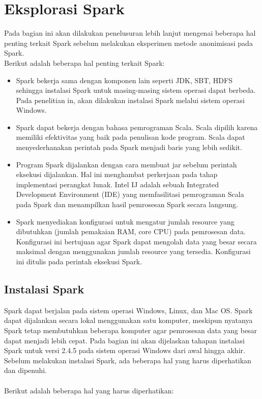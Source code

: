 \section{Eksplorasi Spark}
Pada bagian ini akan dilakukan penelusuran lebih lanjut mengenai beberapa hal penting terkait Spark sebelum melakukan eksperimen metode anonimisasi pada Spark.\\ 

\noindent Berikut adalah beberapa hal penting terkait Spark:
\begin{itemize}

\item Spark bekerja sama dengan komponen lain seperti JDK, SBT, HDFS sehingga instalasi Spark untuk masing-masing sistem operasi dapat berbeda. Pada penelitian in, akan dilakukan instalasi Spark melalui sistem operasi Windows. 

\item Spark dapat bekerja dengan bahasa pemrograman Scala. Scala dipilih karena memiliki efektivitas yang baik pada penulisan kode program. Scala dapat menyederhanakan perintah pada Spark menjadi baris yang lebih sedikit.

\item Program Spark dijalankan dengan cara membuat jar sebelum perintah eksekusi dijalankan. Hal ini menghambat perkerjaan pada tahap implementasi perangkat lunak. Intel IJ adalah sebuah Integrated Development Environment (IDE) yang memfasilitasi pemrograman Scala pada Spark dan menampilkan hasil pemrosesan Spark  secara langsung.

\item Spark menyediakan konfigurasi untuk mengatur jumlah resource  yang dibutuhkan (jumlah pemakaian RAM, core CPU) pada pemrosesan data. Konfigurasi ini bertujuan agar Spark dapat mengolah data yang besar secara maksimal dengan menggunakan jumlah resource yang tersedia. Konfigurasi ini ditulis pada perintah eksekusi Spark.
 

\end{itemize}



\subsection{Instalasi Spark}
Spark dapat berjalan pada sistem operasi Windows, Linux, dan Mac OS. Spark dapat dijalankan secara lokal menggunakan satu komputer, meskipun nyatanya Spark tetap membutuhkan beberapa komputer agar pemrosesan data yang besar dapat menjadi lebih cepat. Pada bagian ini akan dijelaskan tahapan instalasi Spark untuk versi 2.4.5 pada sistem operasi Windows dari awal hingga akhir. Sebelum melakukan instalasi Spark, ada beberapa hal yang harus diperhatikan dan dipenuhi. 
\\\\
\noindent Berikut adalah beberapa hal yang harus diperhatikan:

